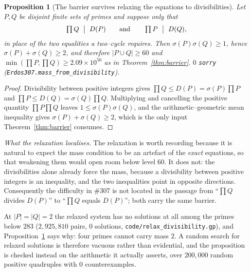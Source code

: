 \documentclass[11pt]{article}
\newtheorem{proposition}[theorem]{Proposition}
\theoremstyle{definition}
\begin{document}
\begin{proposition}[The barrier survives relaxing the equations to divisibilities]\label{prop:divrelax}
Let $P,Q$ be disjoint finite sets of primes and suppose only that
\[ \textstyle\prod Q\ \bigm|\ D(P)\qquad\text{and}\qquad \prod P\ \bigm|\ D(Q), \]
in place of the two equalities a two--cycle requires. Then
$\sigma(P)\sigma(Q)\ge1$, hence $\sigma(P)+\sigma(Q)\ge2$, and therefore $|P\cup Q|\ge60$ and
$\min(\prod P,\prod Q)\ge2.09\times10^{56}$ as in Theorem~\ref{thm:barrier}. $0$ \texttt{sorry}
\textup{(\texttt{Erdos307.mass\_from\_divisibility})}.
\end{proposition}
\begin{proof}
Divisibility between positive integers gives $\prod Q\le D(P)=\sigma(P)\prod P$ and
$\prod P\le D(Q)=\sigma(Q)\prod Q$. Multiplying and cancelling the positive quantity
$\prod P\prod Q$ leaves $1\le\sigma(P)\sigma(Q)$, and the arithmetic--geometric mean inequality
gives $\sigma(P)+\sigma(Q)\ge2$, which is the only input Theorem~\ref{thm:barrier} consumes.
\end{proof}

\emph{What the relaxation localises.} The relaxation is worth recording because it is natural to expect the mass condition to be an
artefact of the \emph{exact} equations, so that weakening them would open room below level $60$. It
does not: the divisibilities alone already force the mass, because a divisibility between positive
integers is an inequality, and the two inequalities point in opposite directions. Consequently the
difficulty in \#307 is not located in the passage from ``$\prod Q$ divides $D(P)$'' to
``$\prod Q$ equals $D(P)$''; both carry the same barrier.

At $|P|=|Q|=2$ the relaxed system has no solutions at all among the primes below $283$
\textup{(}$2{,}925{,}810$ pairs, $0$ solutions, \texttt{code/relax\_divisibility.gp}\textup{)}, and
Proposition~\ref{prop:divrelax} says why: four primes cannot carry mass $2$. A random search for
relaxed solutions is therefore vacuous rather than evidential, and the proposition is checked
instead on the arithmetic it actually asserts, over $200{,}000$ random positive quadruples with $0$
counterexamples.
\end{document}
